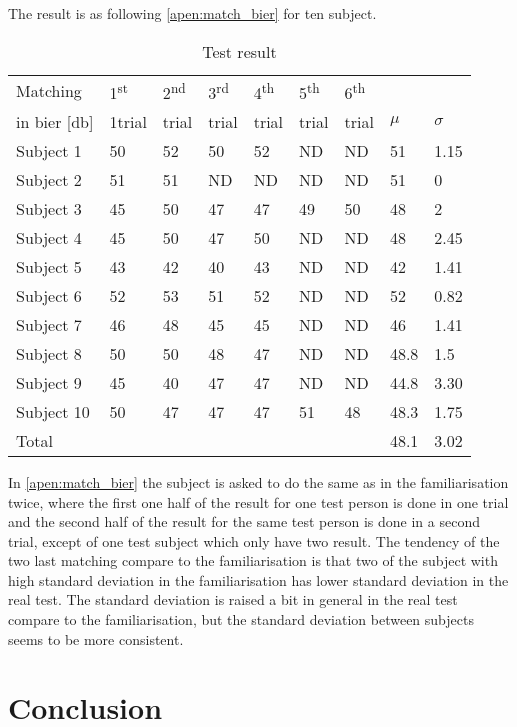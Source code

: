The result is as following \autoref{apen:match_bier} for ten subject. 
\begin{table}[H]
\centering
\caption{Test result}
\begin{tabular}{lllllllll}
\multicolumn{1}{l|}{Matching }   & 1\textsuperscript{st}  & 2\textsuperscript{nd}  & 3\textsuperscript{rd}  & 4\textsuperscript{th} & 5\textsuperscript{th}  & \multicolumn{1}{l|}{6\textsuperscript{th} }                &    &  \\
\multicolumn{1}{l|}{in \gls{bier} [\si{\decibel}] }   & 1trial & trial &  trial &  trial &  trial & \multicolumn{1}{l|}{trial}                & $\mu$   & $\sigma$ \\ \hline
\multicolumn{1}{l|}{Subject 1}  & 50    & 52    & 50    & 52    & ND    & \multicolumn{1}{l|}{ND} & 51   & 1.15  \\
\multicolumn{1}{l|}{Subject 2}  & 51    & 51    & ND    & ND    & ND    & \multicolumn{1}{l|}{ND} & 51   & 0     \\
\multicolumn{1}{l|}{Subject 3}  & 45    & 50    & 47    & 47    & 49    & \multicolumn{1}{l|}{50} & 48   & 2     \\
\multicolumn{1}{l|}{Subject 4}  & 45    & 50    & 47    & 50    & ND    & \multicolumn{1}{l|}{ND} & 48   & 2.45  \\
\multicolumn{1}{l|}{Subject 5}  & 43    & 42    & 40    & 43    & ND    & \multicolumn{1}{l|}{ND} & 42   & 1.41  \\
\multicolumn{1}{l|}{Subject 6}  & 52    & 53    & 51    & 52    & ND    & \multicolumn{1}{l|}{ND} & 52   & 0.82  \\
\multicolumn{1}{l|}{Subject 7}  & 46    & 48    & 45    & 45    & ND    & \multicolumn{1}{l|}{ND} & 46   & 1.41  \\
\multicolumn{1}{l|}{Subject 8}  & 50    & 50    & 48    & 47    & ND    & \multicolumn{1}{l|}{ND} & 48.8 & 1.5   \\
\multicolumn{1}{l|}{Subject 9}  & 45    & 40    & 47    & 47    & ND    & \multicolumn{1}{l|}{ND} & 44.8 & 3.30  \\
\multicolumn{1}{l|}{Subject 10} & 50    & 47    & 47    & 47    & 51    & \multicolumn{1}{l|}{48} & 48.3 & 1.75  \\ \hline
\multicolumn{1}{l|}{Total}      &       &       &       &       &       & \multicolumn{1}{l|}{}   & 48.1     & 3.02     
\end{tabular}
\label{apen:match_bier} 
\end{table}

In \autoref{apen:match_bier} the subject is asked to do the same as in the familiarisation twice, where the first one half of the result for one test person is done in one trial and the second half of the result for the same test person is done in a second trial, except of one test subject which only have two result. The tendency of the two last matching compare to the familiarisation is that two of the subject with high standard deviation in the familiarisation has lower standard deviation in the real test. The standard deviation is raised a bit in general in the real test compare to the familiarisation, but the standard deviation between subjects seems to be more consistent. 

\section*{Conclusion}




